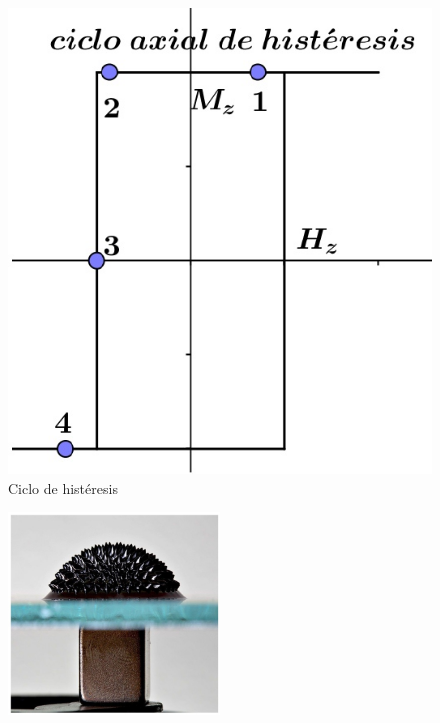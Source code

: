\begin{figure}[H]
  \begin{minipage}[b]{0.47\textwidth}
  \vspace{1cm}
  \end{minipage}
  \hfill
  \begin{minipage}[b]{0.47\textwidth}
     \includegraphics[width=1.10\textwidth]{./Figures/fig310}
     \caption{Ciclo de histéresis}
	\label{fig:31x}
  \end{minipage}
\end{figure}


\begin{figure}[H]
    \centering
    \includegraphics[width=0.5\textwidth]{./Figures/fig30}
	\caption{}
	\label{fig:3x}    
\end{figure}




